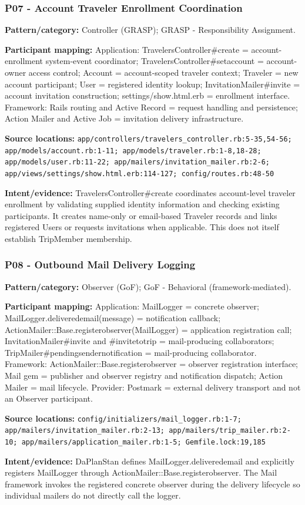 \documentclass[11pt,a4paper]{article}
\renewcommand{\_}{\textunderscore\allowbreak}
\begin{document}
\subsubsection*{P07 - Account Traveler Enrollment Coordination}
\textbf{Pattern/category:} Controller (GRASP); GRASP - Responsibility Assignment.\par
\textbf{Participant mapping:} Application: TravelersController\#create = account-enrollment system-event coordinator; TravelersController\#set\_account = account-owner access control; Account = account-scoped traveler context; Traveler = new account participant; User = registered identity lookup; InvitationMailer\#invite = account invitation construction; settings/show.html.erb = enrollment interface. Framework: Rails routing and Active Record = request handling and persistence; Action Mailer and Active Job = invitation delivery infrastructure.\par
\textbf{Source locations:} \nolinkurl{app/controllers/travelers_controller.rb:5-35,54-56; app/models/account.rb:1-11; app/models/traveler.rb:1-8,18-28; app/models/user.rb:11-22; app/mailers/invitation_mailer.rb:2-6; app/views/settings/show.html.erb:114-127; config/routes.rb:48-50}\par
\textbf{Intent/evidence:} TravelersController\#create coordinates account-level traveler enrollment by validating supplied identity information and checking existing participants. It creates name-only or email-based Traveler records and links registered Users or requests invitations when applicable. This does not itself establish TripMember membership.\par
\subsubsection*{P08 - Outbound Mail Delivery Logging}
\textbf{Pattern/category:} Observer (GoF); GoF - Behavioral (framework-mediated).\par
\textbf{Participant mapping:} Application: MailLogger = concrete observer; MailLogger.delivered\_email(message) = notification callback; ActionMailer::Base.register\_observer(MailLogger) = application registration call; InvitationMailer\#invite and \#invite\_to\_trip = mail-producing collaborators; TripMailer\#pending\_sender\_notification = mail-producing collaborator. Framework: ActionMailer::Base.register\_observer = observer registration interface; Mail gem = publisher and observer registry and notification dispatch; Action Mailer = mail lifecycle. Provider: Postmark = external delivery transport and not an Observer participant.\par
\textbf{Source locations:} \nolinkurl{config/initializers/mail_logger.rb:1-7; app/mailers/invitation_mailer.rb:2-13; app/mailers/trip_mailer.rb:2-10; app/mailers/application_mailer.rb:1-5; Gemfile.lock:19,185}\par
\textbf{Intent/evidence:} DaPlanStan defines MailLogger.delivered\_email and explicitly registers MailLogger through ActionMailer::Base.register\_observer. The Mail framework invokes the registered concrete observer during the delivery lifecycle so individual mailers do not directly call the logger.\par
\end{document}
